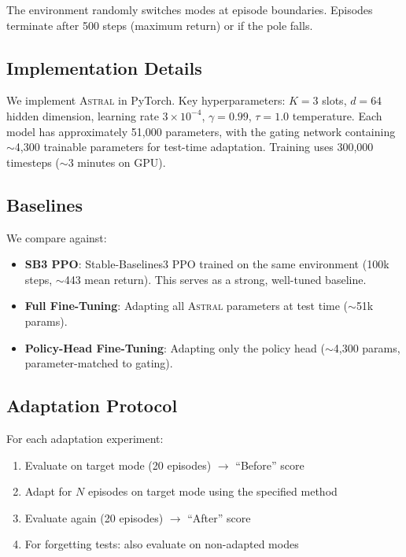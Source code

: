 \documentclass{article}
\newcommand{\astral}{\textsc{Astral}}
\newcommand{\method}{\astral}
\begin{document}
The environment randomly switches modes at episode boundaries. Episodes terminate after 500 steps (maximum return) or if the pole falls.

\subsection{Implementation Details}

We implement \method{} in PyTorch. Key hyperparameters: $K=3$ slots, $d=64$ hidden dimension, learning rate $3 \times 10^{-4}$, $\gamma=0.99$, $\tau=1.0$ temperature. Each model has approximately 51,000 parameters, with the gating network containing $\sim$4,300 trainable parameters for test-time adaptation. Training uses 300,000 timesteps ($\sim$3 minutes on GPU).

\subsection{Baselines}

We compare against:
\begin{itemize}
    \item \textbf{SB3 PPO}: Stable-Baselines3 PPO \citep{stable-baselines3} trained on the same environment (100k steps, $\sim$443 mean return). This serves as a strong, well-tuned baseline.
    \item \textbf{Full Fine-Tuning}: Adapting all \method{} parameters at test time ($\sim$51k params).
    \item \textbf{Policy-Head Fine-Tuning}: Adapting only the policy head ($\sim$4,300 params, parameter-matched to gating).
\end{itemize}

\subsection{Adaptation Protocol}

For each adaptation experiment:
\begin{enumerate}
    \item Evaluate on target mode (20 episodes) $\rightarrow$ ``Before'' score
    \item Adapt for $N$ episodes on target mode using the specified method
    \item Evaluate again (20 episodes) $\rightarrow$ ``After'' score
    \item For forgetting tests: also evaluate on non-adapted modes
\end{enumerate}
\end{document}
